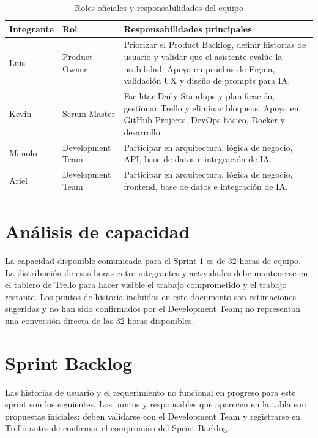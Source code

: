 \documentclass[12pt,a4paper]{article}
\begin{document}
\begin{table}[htbp]
    \centering
    \caption{Roles oficiales y responsabilidades del equipo}
    \label{tab:roles}
    \begin{tabularx}{\textwidth}{L{2.6cm} L{2.0cm}Y}
        \toprule
        \textbf{Integrante} & \textbf{Rol} & \textbf{Responsabilidades principales} \\
        \midrule
        Luis & Product Owner & Priorizar el Product Backlog, definir historias de usuario y validar que el asistente evalúe la usabilidad. Apoya en pruebas de Figma, validación UX y diseño de prompts para IA. \\
        Kevin & Scrum Master & Facilitar Daily Standups y planificación, gestionar Trello y eliminar bloqueos. Apoya en GitHub Projects, DevOps básico, Docker y desarrollo. \\
        Manolo & Development Team & Participar en arquitectura, lógica de negocio, API, base de datos e integración de IA. \\
        Ariel & Development Team & Participar en arquitectura, lógica de negocio, frontend, base de datos e integración de IA. \\
        \bottomrule
    \end{tabularx}
\end{table}

\section{Análisis de capacidad}

La capacidad disponible comunicada para el Sprint 1 es de 32 horas de equipo. La
distribución de esas horas entre integrantes y actividades debe mantenerse en el
tablero de Trello para hacer visible el trabajo comprometido y el trabajo restante.
Los puntos de historia incluidos en este documento son estimaciones sugeridas y no
han sido confirmados por el Development Team; no representan una conversión directa
de las 32 horas disponibles.

\section{Sprint Backlog}

Las historias de usuario y el requerimiento no funcional en progreso para este sprint
son los siguientes. Los puntos y responsables que aparecen en la tabla son propuestas
iniciales: deben validarse con el Development Team y registrarse en Trello antes de
confirmar el compromiso del Sprint Backlog.
\end{document}
